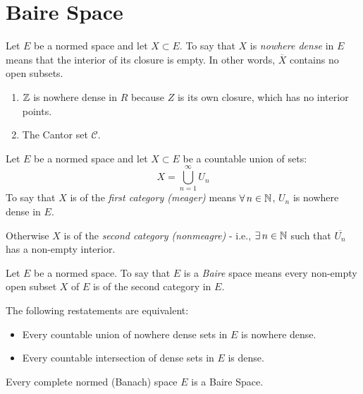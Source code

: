 \documentclass[letterpaper,12pt,fleqn]{article}
\newcommand{\cl}[1]{\overline{#1}}
\begin{document}
\section*{Baire Space}

\begin{definition}
  Let $E$ be a normed space and let $X\subset E$. To say that $X$ is
  \emph{nowhere dense} in $E$ means that the interior of its closure is empty.
  In other words, $\cl{X}$ contains no open subsets.
\end{definition}

\begin{examples}
  \listbreak
  \begin{enumerate}
  \item $\mathbb{Z}$ is nowhere dense in $R$ because $Z$ is its own closure, which
    has no interior points.

  \item The Cantor set $\mathcal{C}$.
  \end{enumerate}
\end{examples}

\begin{definition}[Categories]
  Let $E$ be a normed space and let $X\subset E$ be a countable union of
  sets:
  \[X=\bigcup_{n=1}^{\infty}U_n\]
  To say that $X$ is of the \emph{first category (meager)} means
  $\forall\,n\in\mathbb{N}$, $U_n$ is nowhere dense in $E$.

  Otherwise $X$ is of the \emph{second category (nonmeagre)} - i.e.,
  $\exists\,n\in\mathbb{N}$ such that $\cl{U_n}$ has a non-empty interior.
\end{definition}

\begin{definition}
  Let $E$ be a normed space. To say that $E$ is a \emph{Baire} space means
  every non-empty open subset $X$ of $E$ is of the second category in $E$.

  The following restatements are equivalent:
  \begin{itemize}
  \item Every countable union of nowhere dense sets in $E$ is nowhere dense.
  \item Every countable intersection of dense sets in $E$ is dense.
  \end{itemize}
\end{definition}
  
\begin{theorem}
  Every complete normed (Banach) space $E$ is a Baire Space.
\end{theorem}
\end{document}
